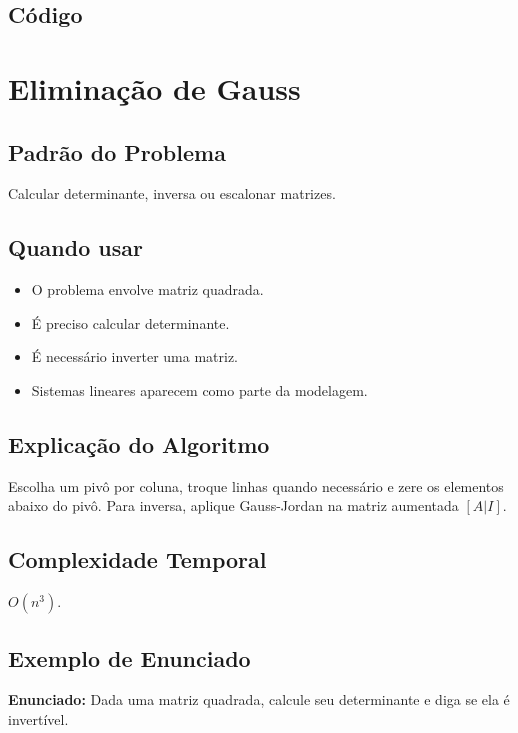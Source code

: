 \subsection{Código}

\section{Eliminação de Gauss}

\subsection{Padrão do Problema}
Calcular determinante, inversa ou escalonar matrizes.

\subsection{Quando usar}
\begin{itemize}[nosep]
  \item O problema envolve matriz quadrada.
  \item É preciso calcular determinante.
  \item É necessário inverter uma matriz.
  \item Sistemas lineares aparecem como parte da modelagem.
\end{itemize}

\subsection{Explicação do Algoritmo}
Escolha um pivô por coluna, troque linhas quando necessário e zere os elementos abaixo do pivô. Para inversa, aplique Gauss-Jordan na matriz aumentada $[A|I]$.

\subsection{Complexidade Temporal}
$O(n^3)$.

\subsection{Exemplo de Enunciado}
\begin{exemplodiabox}
\textbf{Enunciado:} Dada uma matriz quadrada, calcule seu determinante e diga se ela é invertível.
\end{exemplodiabox}

